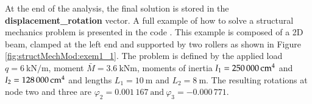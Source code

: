 
At the end of the analysis, the final solution is stored in the
\textbf{displacement\_rotation} vector.  A full example of how to
solve a structural mechanics problem is presented in the code
.
This example is composed of a 2D beam, clamped at the left end and
supported by two rollers as shown in Figure
\ref{fig:structMechMod:exem1_1}.  The problem is defined by the
applied load $q=\SI{6}{\kilo\newton\per\metre}$, moment $\bar{M} =
\SI{3.6}{\kilo\newton\metre}$, moments of inertia $I_1 =
\SI{250\,000}{\centi\metre\tothe{4}}$ and $I_2 =
\SI{128\,000}{\centi\metre\tothe{4}}$ and lengths $L_1 =
\SI{10}{\metre}$ and $L_2 = \SI{8}{\metre}$.  The resulting
rotations at node two and three are $ \varphi_2 = 0.001\,167\
\mbox{and}\ \varphi_3 = -0.000\,771.$

